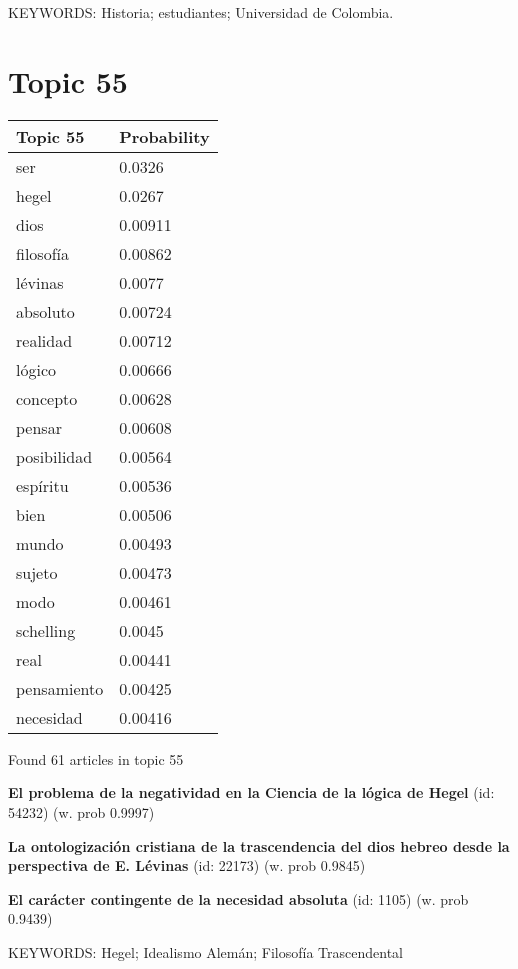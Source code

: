 \documentclass{article}
\begin{document}
KEYWORDS:
Historia; estudiantes; Universidad de Colombia.

\vfill
\newpage


\centering
\thispagestyle{empty}
\section*{Topic 55}\vfill
\begin{tabular}{ll}
\toprule
    Topic 55 & Probability \\
\midrule
         ser &      0.0326 \\
       hegel &      0.0267 \\
        dios &     0.00911 \\
   filosofía &     0.00862 \\
     lévinas &      0.0077 \\
    absoluto &     0.00724 \\
    realidad &     0.00712 \\
      lógico &     0.00666 \\
    concepto &     0.00628 \\
      pensar &     0.00608 \\
 posibilidad &     0.00564 \\
    espíritu &     0.00536 \\
        bien &     0.00506 \\
       mundo &     0.00493 \\
      sujeto &     0.00473 \\
        modo &     0.00461 \\
   schelling &      0.0045 \\
        real &     0.00441 \\
 pensamiento &     0.00425 \\
   necesidad &     0.00416 \\
\bottomrule
\end{tabular}

\vfill
Found 61 articles in topic 55
\vfill

\textbf{El problema de la negatividad en la Ciencia de la lógica de Hegel} (id: 54232)
 (w. prob 0.9997)
\vfill

\textbf{La ontologización cristiana de la trascendencia del dios hebreo desde la perspectiva de E. Lévinas} (id: 22173)
 (w. prob 0.9845)
\vfill

\textbf{El carácter contingente de la necesidad absoluta} (id: 1105)
 (w. prob 0.9439)


KEYWORDS:
Hegel; Idealismo Alemán; Filosofía Trascendental
\end{document}
